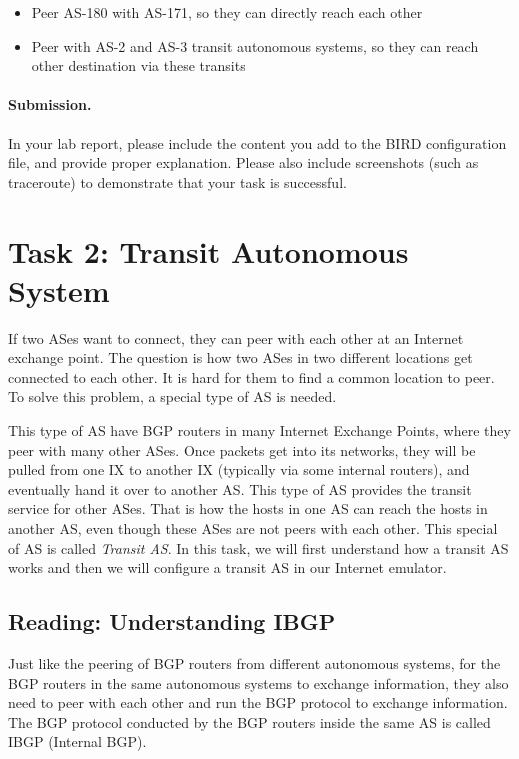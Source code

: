 \begin{itemize}[noitemsep]
  \item Peer AS-180 with AS-171, so they can directly reach each other
  \item Peer with AS-2 and AS-3 transit autonomous systems, so they can
    reach other destination via these transits
\end{itemize}


\paragraph{Submission.}
In your lab report, please include the content you add to the 
BIRD configuration file, and provide proper explanation.
Please also include screenshots (such as traceroute) to demonstrate 
that your task is successful. 


\section{Task 2: Transit Autonomous System} 

If two ASes want to connect, they can peer with each other
at an Internet exchange point. The question is how two ASes in two different locations
get connected to each other. It is hard for them
to find a common location to peer. To solve this problem,
a special type of AS is needed.

This type of AS have BGP routers in many Internet
Exchange Points, where they peer with many other ASes. Once packets get into
its networks, they will be pulled from one IX to another IX (typically via
some internal routers), and eventually
hand it over to another AS. This type of AS provides the transit
service for other ASes. That is how the hosts in one AS can reach the hosts in
another AS, even though these ASes are not peers with each other.
This special of AS is called \textit{Transit AS}.
In this task, we will first understand how a transit AS works and
then we will configure a transit AS in our Internet emulator.  


\subsection{Reading: Understanding IBGP} 

Just like the peering of BGP routers from different
autonomous systems, for the BGP routers in the same
autonomous systems to exchange information, they
also need to peer with each other and run the BGP
protocol to exchange information.
The BGP protocol conducted by the BGP routers
inside the same AS is called IBGP (Internal BGP).

